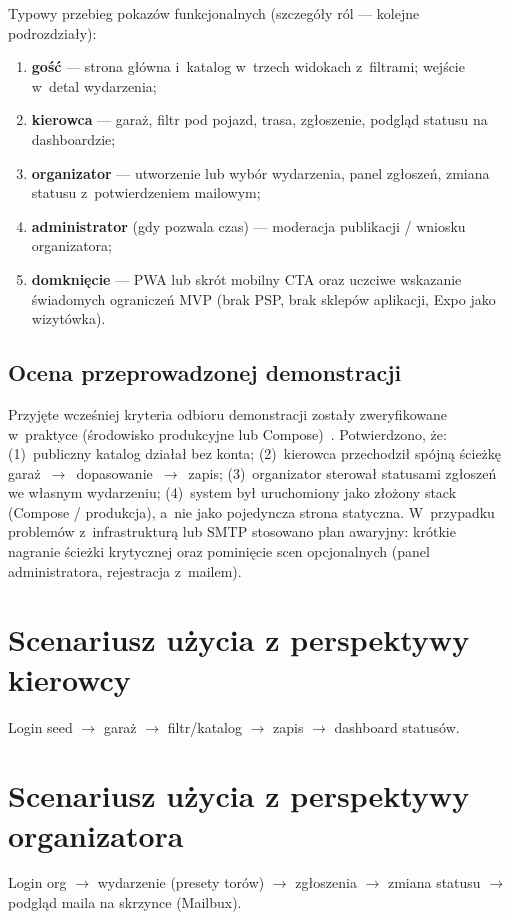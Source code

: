 \documentclass{sprz}
\begin{document}
Typowy przebieg pokazów funkcjonalnych (szczegóły ról --- kolejne podrozdziały):
\begin{enumerate}
  \item \textbf{gość} --- strona główna i~katalog w~trzech widokach z~filtrami; wejście w~detal wydarzenia;
  \item \textbf{kierowca} --- garaż, filtr pod pojazd, trasa, zgłoszenie, podgląd statusu na dashboardzie;
  \item \textbf{organizator} --- utworzenie lub wybór wydarzenia, panel zgłoszeń, zmiana statusu z~potwierdzeniem mailowym;
  \item \textbf{administrator} (gdy pozwala czas) --- moderacja publikacji / wniosku organizatora;
  \item \textbf{domknięcie} --- PWA lub skrót mobilny CTA oraz uczciwe wskazanie świadomych ograniczeń MVP (brak PSP, brak sklepów aplikacji, Expo jako wizytówka).
\end{enumerate}

\subsection*{Ocena przeprowadzonej demonstracji}
Przyjęte wcześniej kryteria odbioru demonstracji zostały zweryfikowane w~praktyce (środowisko produkcyjne lub Compose)~\cite{raceportal:demo}. Potwierdzono, że: (1)~publiczny katalog działał bez konta; (2)~kierowca przechodził spójną ścieżkę garaż~$\rightarrow$~dopasowanie~$\rightarrow$~zapis; (3)~organizator sterował statusami zgłoszeń we własnym wydarzeniu; (4)~system był uruchomiony jako złożony stack (Compose / produkcja), a~nie jako pojedyncza strona statyczna. W~przypadku problemów z~infrastrukturą lub SMTP stosowano plan awaryjny: krótkie nagranie ścieżki krytycznej oraz pominięcie scen opcjonalnych (panel administratora, rejestracja z~mailem).

\section{Scenariusz użycia z perspektywy kierowcy}
Login seed $\rightarrow$ garaż $\rightarrow$ filtr/katalog $\rightarrow$ zapis $\rightarrow$ dashboard statusów.
\section{Scenariusz użycia z perspektywy organizatora}
Login org $\rightarrow$ wydarzenie (presety torów) $\rightarrow$ zgłoszenia $\rightarrow$ zmiana statusu $\rightarrow$ podgląd maila na skrzynce (Mailbux).
\end{document}
